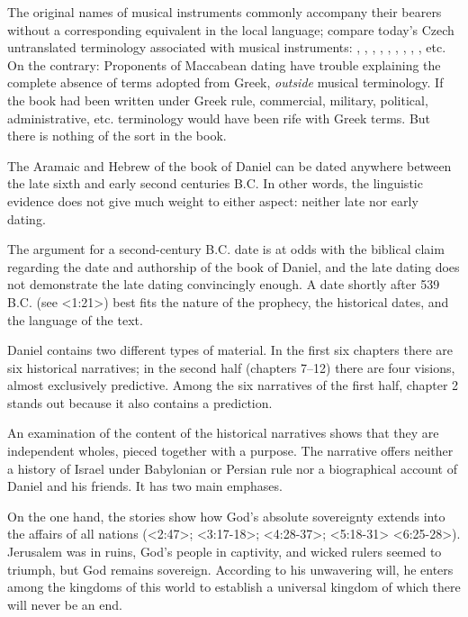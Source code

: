 The original names of musical instruments commonly accompany their bearers without a corresponding equivalent in the local language; compare today's Czech untranslated terminology associated with musical instruments:  , , , , , , , , , etc.
On the contrary: Proponents of Maccabean dating have trouble explaining the complete absence of terms adopted from Greek, {{\it outside\/}} musical terminology. If the book had been written under Greek rule, commercial, military, political, administrative, etc. terminology would have been rife with Greek terms. But there is nothing of the sort in the book.

The Aramaic and Hebrew of the book of Daniel can be dated anywhere between the late sixth and early second centuries B.C. In other words, the linguistic evidence does not give much weight to either aspect: neither late nor early dating.

The argument for a second-century B.C. date is at odds with the biblical claim regarding the date and authorship of the book of Daniel, and the late dating does not demonstrate the late dating convincingly enough.   A date shortly after 539 B.C. (see <1:21>) best fits the nature of the prophecy, the historical dates, and the language of the text.

 
Daniel contains two different types of material.
 In the first six chapters there are six historical narratives; in the second half (chapters 7--12) there are four visions, almost exclusively predictive. Among the six narratives of the first half, chapter 2 stands out because it also contains a prediction. 

An examination of the content of the historical narratives shows that they are independent wholes, pieced together with a purpose.
The narrative offers neither a history of Israel under Babylonian or Persian rule nor a biographical account of Daniel and his friends. It has two main emphases.

On the one hand, the stories show how God's absolute sovereignty extends into the affairs of all nations 
(<2:47>; <3:17-18>; <4:28-37>; <5:18-31> <6:25-28>).
Jerusalem was in ruins, God's people in captivity, and wicked rulers seemed to triumph, but God remains sovereign.
According to his unwavering will, he enters among the kingdoms of this world to establish a universal kingdom of which there will never be an end.

